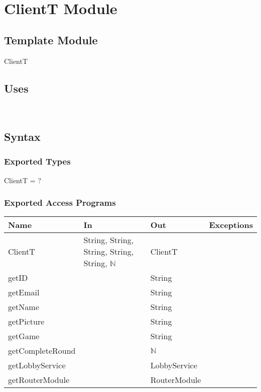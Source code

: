 \documentclass[12pt, titlepage]{article}
\begin{document}
\newpage
~\newpage


\section{ClientT Module} \label{ClientT}
\subsection{Template Module}
ClientT
\subsection{Uses}
 \\ 


\subsection{Syntax}

\subsubsection{Exported Types}

ClientT = ?

\subsubsection{Exported Access Programs}

\begin{center}
\begin{tabular}{ |  p{4cm} | p{3cm} |  p{3cm} | p{5cm} | }
\hline
\textbf{Name} & \textbf{In} & \textbf{Out} & \textbf{Exceptions} \\
\hline
ClientT & String, String, String, String, String, $\mathbb{N}$  &  ClientT &  \\
getID & & String & \\
getEmail & & String & \\
getName & & String & \\
getPicture & & String & \\
getGame & & String & \\
getCompleteRound & & $\mathbb{N}$ & \\
getLobbyService & & LobbyService & \\
getRouterModule & & RouterModule & \\

\hline
\end{tabular}
\end{center}
\end{document}
